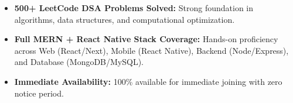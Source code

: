 \documentclass[a4paper,10pt]{article}
\begin{document}
\begin{itemize}

    \item \textbf{500+ LeetCode DSA Problems Solved:} Strong foundation in algorithms, data structures, and computational optimization.

    \item \textbf{Full MERN + React Native Stack Coverage:} Hands-on proficiency across Web (React/Next), Mobile (React Native), Backend (Node/Express), and Database (MongoDB/MySQL).

    \item \textbf{Immediate Availability:} 100\% available for immediate joining with zero notice period.

\end{itemize}

\end{document}

